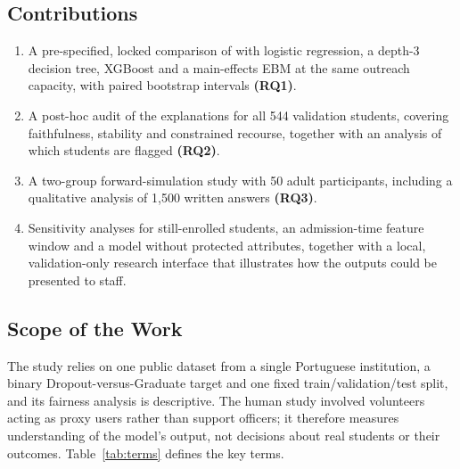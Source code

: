 \subsection{Contributions}

\begin{enumerate}[nosep,leftmargin=*]
  \item A pre-specified, locked comparison of \tabicl with logistic regression, a depth-3 decision
  tree, XGBoost and a main-effects EBM at the same outreach capacity, with paired bootstrap
  intervals \textbf{(RQ1)}.
  \item A post-hoc audit of the explanations for all 544 validation students, covering
  faithfulness, stability and constrained recourse, together with an analysis of which students are
  flagged \textbf{(RQ2)}.
  \item A two-group forward-simulation study with 50 adult participants, including a qualitative
  analysis of 1,500 written answers \textbf{(RQ3)}.
  \item Sensitivity analyses for still-enrolled students, an admission-time feature window and a
  model without protected attributes, together with a local, validation-only research interface
  that illustrates how the outputs could be presented to staff.
\end{enumerate}

\subsection{Scope of the Work}

The study relies on one public dataset from a single Portuguese institution, a binary
Dropout-versus-Graduate target and one fixed train/validation/test split, and its fairness analysis
is descriptive. The human study involved volunteers acting as proxy users rather than support
officers; it therefore measures understanding of the model's output, not decisions about real
students or their outcomes. Table~\ref{tab:terms} defines the key terms.

